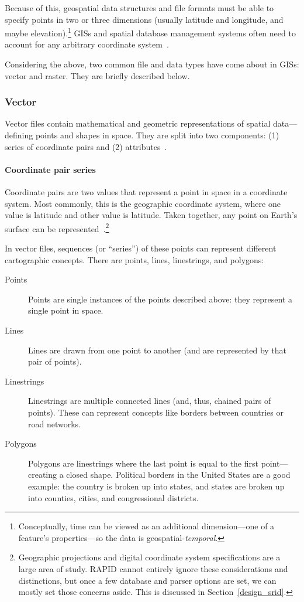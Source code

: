 Because of this, geospatial data structures and file formats must be able to specify points in two or three dimensions (usually latitude and longitude, and maybe elevation).\footnote{Conceptually, time can be viewed as an additional dimension---one of a feature's properties---so the data is geospatial-\textit{temporal}.} GISs and spatial database management systems often need to account for any arbitrary coordinate system~\cite{gentle_intro}.

Considering the above, two common file and data types have come about in GISs: vector and raster. They are briefly described below.

\subsubsection{Vector}
\label{sec:vector}
Vector files contain mathematical and geometric representations of spatial data---defining points and shapes in space. They are split into two components: (1) series of coordinate pairs and (2) attributes~\cite{gentle_intro}.

\paragraph{Coordinate pair series}
Coordinate pairs are two values that represent a point in space in a coordinate system. Most commonly, this is the geographic coordinate system, where one value is latitude and other value is latitude. Taken together, any point on Earth's surface can be represented~\cite{gentle_intro}.\footnote{Geographic projections and digital coordinate system specifications are a large area of study. RAPID cannot entirely ignore these considerations and distinctions, but once a few database and parser options are set, we can mostly set those concerns aside. This is discussed in Section~\ref{design_srid}.}

In vector files, sequences (or ``series'') of these points can represent different cartographic concepts. There are points, lines, linestrings, and polygons:

\begin{description}
  \item[Points] Points are single instances of the points described above: they represent a single point in space.
  \item[Lines] Lines are drawn from one point to another (and are represented by that pair of points).
  \item[Linestrings] Linestrings are multiple connected lines (and, thus, chained pairs of points). These can represent concepts like borders between countries or road networks.
  \item[Polygons] Polygons are linestrings where the last point is equal to the first point---creating a closed shape. Political borders in the United States are a good example: the country is broken up into states, and states are broken up into counties, cities, and congressional districts.
\end{description}

